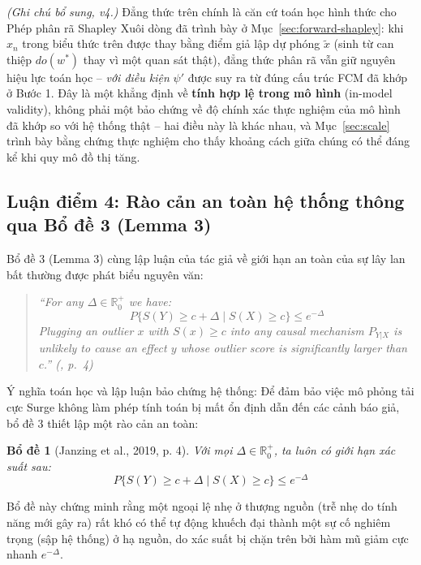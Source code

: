 \documentclass[11pt,a4paper]{article}
\newtheorem{lemma}{Bổ đề}
\begin{document}
\textit{(Ghi chú bổ sung, v4.)} Đẳng thức trên chính là căn cứ toán học hình thức cho Phép phân rã Shapley Xuôi dòng đã trình bày ở Mục~\ref{sec:forward-shapley}: khi $x_n$ trong biểu thức trên được thay bằng điểm giả lập dự phóng $\tilde{x}$ (sinh từ can thiệp $do(w^*)$ thay vì một quan sát thật), đẳng thức phân rã vẫn giữ nguyên hiệu lực toán học -- \emph{với điều kiện} $\psi'$ được suy ra từ đúng cấu trúc FCM đã khớp ở Bước 1. Đây là một khẳng định về \textbf{tính hợp lệ trong mô hình} (in-model validity), không phải một bảo chứng về độ chính xác thực nghiệm của mô hình đã khớp so với hệ thống thật -- hai điều này là khác nhau, và Mục~\ref{sec:scale} trình bày bằng chứng thực nghiệm cho thấy khoảng cách giữa chúng có thể đáng kể khi quy mô đồ thị tăng.

\subsection{Luận điểm 4: Rào cản an toàn hệ thống thông qua Bổ đề 3 (Lemma 3)}

Bổ đề 3 (Lemma 3) cùng lập luận của tác giả về giới hạn an toàn của sự lây lan bất thường được phát biểu nguyên văn:
\begin{quote}
\itshape
``For any $\Delta \in \mathbb{R}^+_0$ we have:
\begin{equation*}
P\{S(Y) \ge c + \Delta \mid S(X) \ge c\} \le e^{-\Delta}
\end{equation*}
Plugging an outlier $x$ with $S(x) \ge c$ into any causal mechanism $P_{Y|X}$ is unlikely to cause an effect $y$ whose outlier score is significantly larger than $c$.'' (\cite{janzing2019rootcause}, p.~4)
\end{quote}

Ý nghĩa toán học và lập luận bảo chứng hệ thống:
Để đảm bảo việc mô phỏng tải cực Surge không làm phép tính toán bị mất ổn định dẫn đến các cảnh báo giả, bổ đề 3 thiết lập một rào cản an toàn:
\begin{lemma}[Janzing et al., 2019, p. 4]
Với mọi $\Delta \in \mathbb{R}^+_0$, ta luôn có giới hạn xác suất sau:
\begin{equation}
P\{S(Y) \ge c + \Delta \mid S(X) \ge c\} \le e^{-\Delta}
\end{equation}
\end{lemma}
Bổ đề này chứng minh rằng một ngoại lệ nhẹ ở thượng nguồn (trễ nhẹ do tính năng mới gây ra) rất khó có thể tự động khuếch đại thành một sự cố nghiêm trọng (sập hệ thống) ở hạ nguồn, do xác suất bị chặn trên bởi hàm mũ giảm cực nhanh $e^{-\Delta}$.
\end{document}
